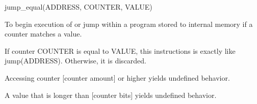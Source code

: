 

\format
jump\_equal(ADDRESS, COUNTER, VALUE)

\purpose

To begin execution of or jump within a program stored to internal memory if a counter matches a value.

\description

If counter COUNTER is equal to VALUE, this instructions is exactly like jump(ADDRESS).
Otherwise, it is discarded.

\notes

Accessing counter [counter amount] or higher yields undefined behavior.

A value that is longer than [counter bits] yields undefined behavior.
